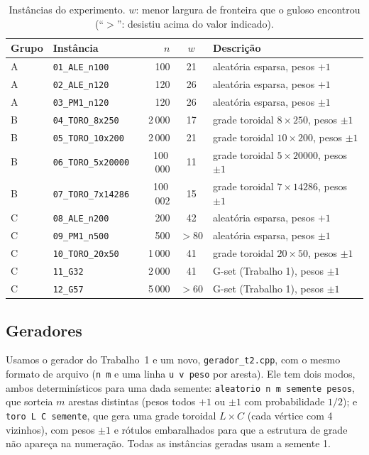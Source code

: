 \begin{table}[ht]\centering\footnotesize
\caption{Instâncias do experimento. $w$: menor largura de fronteira que o guloso encontrou (``$>$'': desistiu acima do valor indicado).}\label{tab:familias}
\begin{tabular}{llrcl}\hline
Grupo & Instância & $n$ & $w$ & Descrição\\\hline
A & \texttt{01\_ALE\_n100} & 100 & 21 & aleatória esparsa, pesos $+1$\\
A & \texttt{02\_ALE\_n120} & 120 & 26 & aleatória esparsa, pesos $+1$\\
A & \texttt{03\_PM1\_n120} & 120 & 26 & aleatória esparsa, pesos $\pm1$\\
B & \texttt{04\_TORO\_8x250} & 2\,000 & 17 & grade toroidal $8\times250$, pesos $\pm1$\\
B & \texttt{05\_TORO\_10x200} & 2\,000 & 21 & grade toroidal $10\times200$, pesos $\pm1$\\
B & \texttt{06\_TORO\_5x20000} & 100\,000 & 11 & grade toroidal $5\times20000$, pesos $\pm1$\\
B & \texttt{07\_TORO\_7x14286} & 100\,002 & 15 & grade toroidal $7\times14286$, pesos $\pm1$\\
C & \texttt{08\_ALE\_n200} & 200 & 42 & aleatória esparsa, pesos $+1$\\
C & \texttt{09\_PM1\_n500} & 500 & $>80$ & aleatória esparsa, pesos $\pm1$\\
C & \texttt{10\_TORO\_20x50} & 1\,000 & 41 & grade toroidal $20\times50$, pesos $\pm1$\\
C & \texttt{11\_G32} & 2\,000 & 41 & G-set (Trabalho 1), pesos $\pm1$\\
C & \texttt{12\_G57} & 5\,000 & $>60$ & G-set (Trabalho 1), pesos $\pm1$\\\hline
\end{tabular}
\end{table}

\subsection{Geradores}

Usamos o gerador do Trabalho~1 e um novo, \texttt{gerador\_t2.cpp}, com o mesmo formato de arquivo (\texttt{n m} e uma linha \texttt{u v peso} por aresta). Ele tem dois modos, ambos determinísticos para uma dada semente: \texttt{aleatorio n m semente pesos}, que sorteia $m$ arestas distintas (pesos todos $+1$ ou $\pm1$ com probabilidade $1/2$); e \texttt{toro L C semente}, que gera uma grade toroidal $L\times C$ (cada vértice com 4 vizinhos), com pesos $\pm1$ e rótulos embaralhados para que a estrutura de grade não apareça na numeração. Todas as instâncias geradas usam a semente 1.

